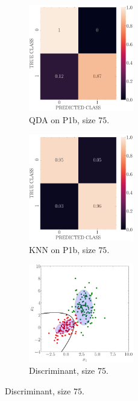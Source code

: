 \documentclass[11pt, a4 paper]{article}
\begin{document}
\begin{figure}[!htbp]
\quad    
    \begin{subfigure}[!htbp]{0.24\textwidth}
       \centering
       \includegraphics[width=1.8in]{../results/ex1/conf_mtx_QD_ML_dataset_P1b_size_75.pdf}
       \caption{QDA on P1b, size $75$.}
       \label{fig:KNN_P1b_75}
    \end{subfigure}
\quad    
    \begin{subfigure}[!htbp]{0.24\textwidth}
       \centering
       \includegraphics[width=1.8in]{../results/ex1/conf_mtx_KNN_dataset_P1b_size_75.pdf}
       \caption{KNN on P1b, size $75$.}
       \label{fig:KNN_P1b_75}
    \end{subfigure}
\quad
    \begin{subfigure}[!htbp]{0.24\textwidth}
       \centering
       \includegraphics[width=1.8in]{../results/ex1/samples_QD_ML_dataset_P1b_size_75.pdf}
       \caption{Discriminant, size $75$.}
       \label{fig:KNN_P1b_75}
    \end{subfigure}
    

\end{figure}
\end{document}
